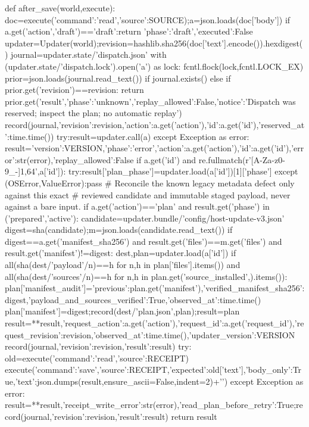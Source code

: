 def after_save(world,execute):
 doc=execute({'command':'read','source':SOURCE});a=json.loads(doc['body'])
 if a.get('action','draft')=='draft':return {'phase':'draft','executed':False}
 updater=Updater(world);revision=hashlib.sha256(doc['text'].encode()).hexdigest()
 journal=updater.state/'dispatch.json'
 with (updater.state/'dispatch.lock').open('a') as lock:
  fcntl.flock(lock,fcntl.LOCK_EX)
  prior=json.loads(journal.read_text()) if journal.exists() else {}
  if prior.get('revision')==revision:
   return prior.get('result',{'phase':'unknown','replay_allowed':False,'notice':'Dispatch was reserved; inspect the plan; no automatic replay'})
  record(journal,{'revision':revision,'action':a.get('action'),'id':a.get('id'),'reserved_at':time.time()})
  try:result=updater.call(a)
  except Exception as error:
   result={'version':VERSION,'phase':'error','action':a.get('action'),'id':a.get('id'),'error':str(error),'replay_allowed':False}
   if a.get('id') and re.fullmatch(r'[A-Za-z0-9_-]{1,64}',a['id']):
    try:result['plan_phase']=updater.load(a['id'])[1]['phase']
    except (OSError,ValueError):pass
  # Reconcile the known legacy metadata defect only against this exact
  # reviewed candidate and immutable staged payload, never against a bare input.
  if a.get('action')=='plan' and result.get('phase') in ('prepared','active'):
   candidate=updater.bundle/'config/host-update-v3.json'
   digest=sha(candidate);m=json.loads(candidate.read_text())
   if digest==a.get('manifest_sha256') and result.get('files')==m.get('files') and result.get('manifest')!=digest:
    dest,plan=updater.load(a['id'])
    if all(sha(dest/'payload'/n)==h for n,h in plan['files'].items()) and all(sha(dest/'sources'/n)==h for n,h in plan.get('source_installed',{}).items()):
     plan['manifest_audit']={'previous':plan.get('manifest'),'verified_manifest_sha256':digest,'payload_and_sources_verified':True,'observed_at':time.time()}
     plan['manifest']=digest;record(dest/'plan.json',plan);result=plan
  result={**result,'request_action':a.get('action'),'request_id':a.get('request_id'),'request_revision':revision,'observed_at':time.time(),'updater_version':VERSION}
  record(journal,{'revision':revision,'result':result})
  try:
   old=execute({'command':'read','source':RECEIPT})
   execute({'command':'save','source':RECEIPT,'expected':old['text'],'body_only':True,'text':json.dumps(result,ensure_ascii=False,indent=2)+'\n'})
  except Exception as error:
   result={**result,'receipt_write_error':str(error),'read_plan_before_retry':True};record(journal,{'revision':revision,'result':result})
  return result

